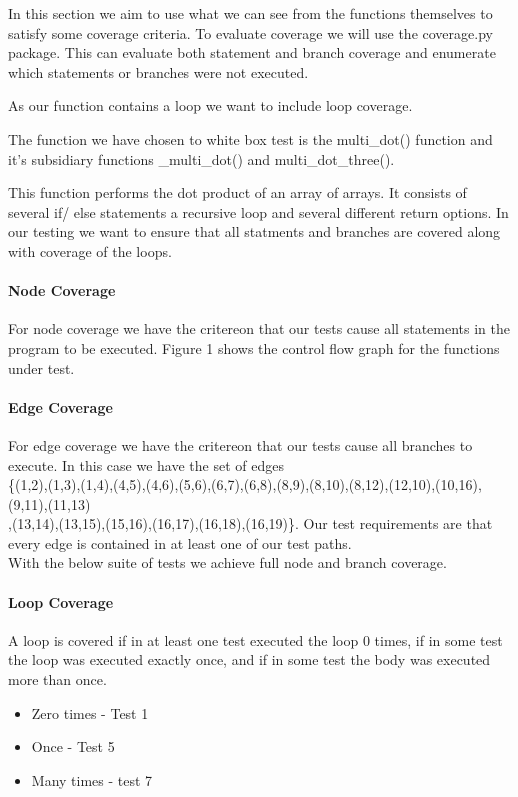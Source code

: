In this section we aim to use what we can see from the functions themselves to satisfy some coverage
criteria. To evaluate coverage we will use the coverage.py package. This can evaluate both statement and branch coverage and enumerate which statements or branches were not executed.

As our function contains a loop we want to include loop coverage. 

The function we have chosen to white box test is the multi\_dot() function and it's subsidiary functions \_multi\_dot() and multi\_dot\_three().

This function performs the dot product of an array of arrays. It consists of several if/ else statements a recursive loop and several different return options. In our testing we want to ensure that all statments and branches are covered along with coverage of the loops. 



\paragraph{Node Coverage}


For node coverage we have the critereon that our tests cause all statements in the program to be executed. Figure 1 shows the control flow graph for the functions under test. 



\paragraph{Edge Coverage}

For edge coverage we have the critereon that our tests cause all branches to execute. In this case we have the set of edges \\
\{(1,2),(1,3),(1,4),(4,5),(4,6),(5,6),(6,7),(6,8),(8,9),(8,10),(8,12),(12,10),(10,16),(9,11),(11,13)\\
,(13,14),(13,15),(15,16),(16,17),(16,18),(16,19)\}.
Our test requirements are that every edge is contained in at least one of our test paths.
\\
With the below suite of tests we achieve full node and branch coverage.

\paragraph{Loop Coverage}

A loop is covered if in at least one test executed the loop 0 times, if in some test the loop was executed exactly once, and if in some test the body was executed more than once.
\begin{itemize}
\item Zero times - Test 1 
\item Once - Test 5
\item Many times - test 7
\end{itemize}


